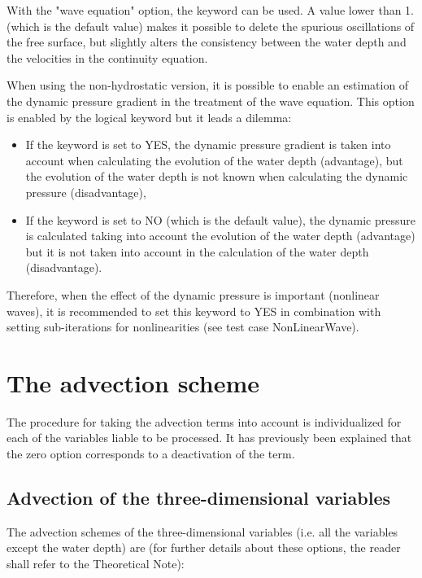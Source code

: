 With the "wave equation" option, the keyword
 can be used.
A value lower than 1. (which is the default value) makes
it possible to delete the spurious oscillations of the free surface, but
slightly alters the consistency between the water depth and the velocities in
the continuity equation.

When using the non-hydrostatic version, it is possible to enable an estimation
of the dynamic pressure gradient in the treatment of the wave equation.
This option is enabled by the logical keyword
 but it leads a dilemma:

\begin{itemize}
\item If the keyword is set to YES, the dynamic pressure gradient is taken
into account when calculating the evolution of the water depth (advantage), but
the evolution of the water depth is not known when calculating the dynamic
pressure (disadvantage),

\item If the keyword is set to NO (which is the default value), the dynamic
pressure is calculated taking into account the evolution of the water depth
(advantage) but it is not taken into account in the calculation of the water
depth (disadvantage).
\end{itemize}

Therefore, when the effect of the dynamic pressure is important (nonlinear
waves), it is recommended to set this keyword to YES in combination with
setting sub-iterations for nonlinearities (see test case NonLinearWave).


\section{The advection scheme}
\label{sec:advection}
The procedure for taking the advection terms into account is individualized
for each of the variables liable to be processed. It has previously been
explained that the zero option corresponds to a deactivation of the term.


\subsection{Advection of the three-dimensional variables}

The advection schemes of the three-dimensional variables (i.e.
all the variables except the water depth) are (for further details about these
options, the reader shall refer to the Theoretical Note):

